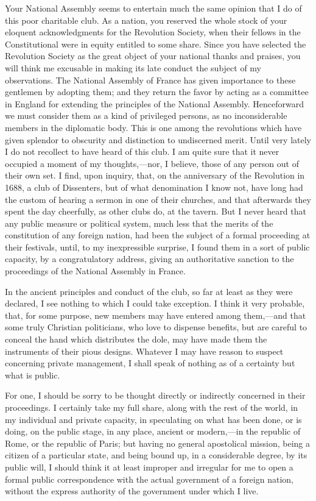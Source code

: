 Your National Assembly seems to entertain much the same opinion that I do of this poor charitable club. As a nation, you reserved the whole stock of your eloquent acknowledgments for the Revolution Society, when their fellows in the Constitutional were in equity entitled to some share. Since you have selected the Revolution Society as the great object of your national thanks and praises, you will think me excusable in making its late conduct the subject of my observations. The National Assembly of France has given importance to these gentlemen by adopting them; and they return the favor by acting as a committee in England for extending the principles of the National Assembly. Henceforward we must consider them as a kind of privileged persons, as no inconsiderable members in the diplomatic body. This is one among the revolutions which have given splendor to obscurity and distinction to undiscerned merit. Until very lately I do not recollect to have heard of this club. I am quite sure that it never occupied a moment of my thoughts,—nor, I believe, those of any person out of their own set. I find, upon inquiry, that, on the anniversary of the Revolution in 1688, a club of Dissenters, but of what denomination I know not, have long had the custom of hearing a sermon in one of their churches, and that afterwards they spent the day cheerfully, as other clubs do, at the tavern. But I never heard that any public measure or political system, much less that the merits of the constitution of any foreign nation, had been the subject of a formal proceeding at their festivals, until, to my inexpressible surprise, I found them in a sort of public capacity, by a congratulatory address, giving an authoritative sanction to the proceedings of the National Assembly in France.

In the ancient principles and conduct of the club, so far at least as they were declared, I see nothing to which I could take exception. I think it very probable, that, for some purpose, new members may have entered among them,—and that some truly Christian politicians, who love to dispense benefits, but are careful to conceal the hand which distributes the dole, may have made them the instruments of their pious designs. Whatever I may have reason to suspect concerning private management, I shall speak of nothing as of a certainty but what is public.

For one, I should be sorry to be thought directly or indirectly concerned in their proceedings. I certainly take my full share, along with the rest of the world, in my individual and private capacity, in speculating on what has been done, or is doing, on the public stage, in any place, ancient or modern,—in the republic of Rome, or the republic of Paris; but having no general apostolical mission, being a citizen of a particular state, and being bound up, in a considerable degree, by its public will, I should think it at least improper and irregular for me to open a formal public correspondence with the actual government of a foreign nation, without the express authority of the government under which I live.

